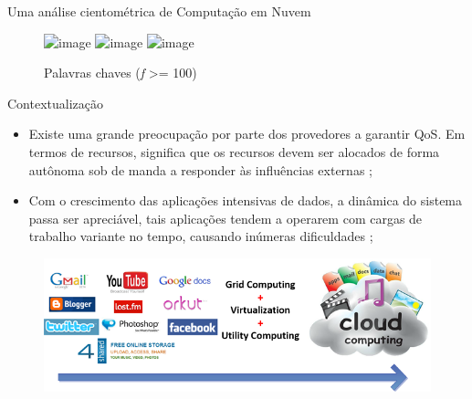 \begin{frame}{Uma análise cientométrica de Computação em Nuvem}
	\begin{figure}[htb]
		\centering
		\caption{Palavras chaves (\textit{f} >= 100) \cite{Heilig2014}}
		\includegraphics<1>[scale=0.4]{images/keyword-computing.png}
		\includegraphics<2>[scale=0.4]{images/keyword-computing2.png}
		\includegraphics<3>[scale=0.4]{images/keyword-computing3.png}
	\end{figure}
\end{frame}

\begin{frame}{Contextualização}
	
	\begin{itemize}
		\item Existe uma grande preocupação por parte dos provedores a garantir QoS. Em termos de recursos, significa que os recursos devem ser alocados de forma autônoma sob de manda a responder às influências externas \cite{Padala2007};
		\item Com o crescimento das aplicações intensivas de dados, a dinâmica do sistema passa ser apreciável, tais aplicações tendem a operarem com cargas de trabalho variante no	tempo, causando inúmeras dificuldades \cite{Padala2007}; 		
	\end{itemize}	
	
	\begin{figure}[!htb]
		\centering 
		\includegraphics[scale=0.55]{images/cloud-computing.png}
	\end{figure}
	
\end{frame}

